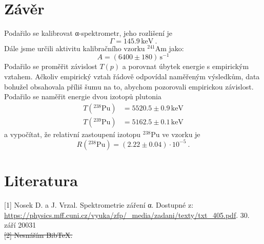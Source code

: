 \documentclass[10pt,a4paper]{article}
\renewcommand{\U}[1]{\ensuremath{\,\mathrm{#1}}}
\newcommand{\°}{\degree}
\begin{document}
\section{Závěr}
Podařilo se kalibrovat α-spektrometr, jeho rozlišení je
\begin{equation*}
    \Gamma = 145.9 \U{keV} \: .
\end{equation*}
Dále jsme určili aktivitu kalibračního vzorku $^{241}$Am jako:
\begin{equation*}
    A = (6400 \pm 180) \U{s^{-1}}
\end{equation*}
Podařilo se proměřit závislost $T(p)$ a porovnat úbytek energie s empirickým vztahem. Ačkoliv empirický vztah řádově odpovídal naměřeným výsledkům, data bohužel obsahovala příliš šumu na to, abychom pozorovali empirickou závislost.
\\
Podařilo se naměřit energie dvou izotopů plutonia
\begin{align*}
    T({}^{238}\text{Pu}) &= 5520.5 \pm 0.9 \U{keV} \\
    T({}^{239}\text{Pu}) &= 5162.5 \pm 0.1 \U{keV}
\end{align*}
a vypočítat, že relativní zastoupení izotopu $^{238}$Pu ve vzorku je
\begin{equation*}
    R({}^{238}\text{Pu})
    = (2.22 \pm 0.04) \cdot 10^{-5} \: .
\end{equation*}


\section{Literatura}
[1] Nosek D. a J. Vrzal. Spektrometrie záření α. Dostupné z: \url{https://physics.mff.cuni.cz/vyuka/zfp/_media/zadani/texty/txt_405.pdf}. 30. září 20031
\\
\st{[2] Nesnáším BibTeX.}
\end{document}

